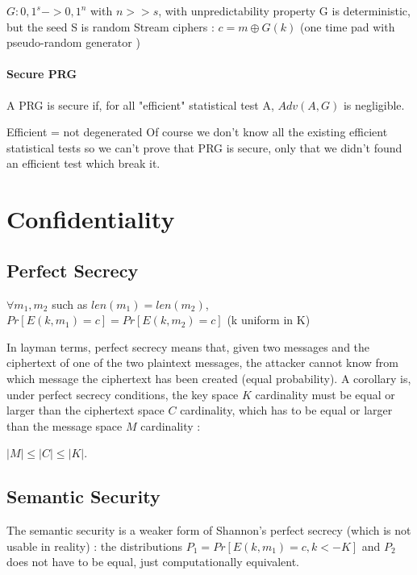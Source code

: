 $ G : {0,1}^s -> {0,1}^n $  with  $n>>s$, with unpredictability property
G is deterministic, but the seed S is random
Stream ciphers : $c = m \oplus G(k) $  (one time pad with pseudo-random generator )


\paragraph{Secure PRG \\}
A PRG is secure if, for all "efficient" statistical test A, $Adv(A,G)$ is negligible.

Efficient = not degenerated
Of course we don't know all the existing efficient statistical tests so we can't prove that PRG is secure, only that we didn't found an efficient test which break it.


\section{Confidentiality}
\subsection{Perfect Secrecy}

\begin{mytheorem}
    $\forall m_1,m_2$ such as $len(m_1) = len(m_2)$, 
    $Pr[E(k,m_1) = c] = Pr[E(k,m_2) = c]$  \flushright (k uniform in K)
\end{mytheorem}

In layman terms, perfect secrecy means that, given two messages and the ciphertext of one of the two plaintext messages, the attacker cannot know from which message the ciphertext has been created (equal probability). A corollary is, under perfect secrecy conditions, the key space $K$ cardinality must be equal or larger than the ciphertext space $C$ cardinality, which has to be equal or larger than the message space $M$ cardinality :
\begin{mytheorem}
    $ |M| \leq |C| \leq |K| $. 
\end{mytheorem}


\subsection{Semantic Security}

The semantic security is a weaker form of Shannon's perfect secrecy (which is not usable in reality) : the distributions $P_1 = Pr[E(k,m_1) = c , k<- K]$ and $P_2$ does not have to be equal, just computationally equivalent.

